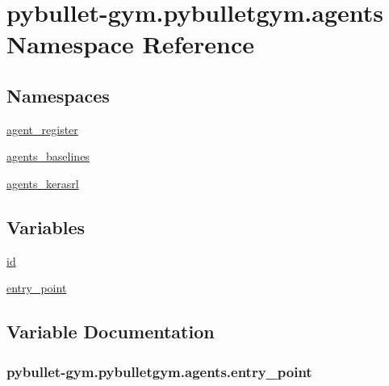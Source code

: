 \hypertarget{namespacepybullet-gym_1_1pybulletgym_1_1agents}{}\section{pybullet-\/gym.pybulletgym.\+agents Namespace Reference}
\label{namespacepybullet-gym_1_1pybulletgym_1_1agents}
\subsection*{Namespaces}
\begin{DoxyCompactItemize}
\item 
 \hyperlink{namespacepybullet-gym_1_1pybulletgym_1_1agents_1_1agent__register}{agent\+\_\+register}
\item 
 \hyperlink{namespacepybullet-gym_1_1pybulletgym_1_1agents_1_1agents__baselines}{agents\+\_\+baselines}
\item 
 \hyperlink{namespacepybullet-gym_1_1pybulletgym_1_1agents_1_1agents__kerasrl}{agents\+\_\+kerasrl}
\end{DoxyCompactItemize}
\subsection*{Variables}
\begin{DoxyCompactItemize}
\item 
\hyperlink{namespacepybullet-gym_1_1pybulletgym_1_1agents_a0c7585c58d4374c748bb1a19ca9ae5b7}{id}
\item 
\hyperlink{namespacepybullet-gym_1_1pybulletgym_1_1agents_a21dc32ada053ca5c8d9fece96bff7091}{entry\+\_\+point}
\end{DoxyCompactItemize}


\subsection{Variable Documentation}
\subsubsection[{\texorpdfstring{entry\+\_\+point}{entry_point}}]{\setlength{\rightskip}{0pt plus 5cm}pybullet-\/gym.\+pybulletgym.\+agents.\+entry\+\_\+point}\hypertarget{namespacepybullet-gym_1_1pybulletgym_1_1agents_a21dc32ada053ca5c8d9fece96bff7091}{}\label{namespacepybullet-gym_1_1pybulletgym_1_1agents_a21dc32ada053ca5c8d9fece96bff7091}
